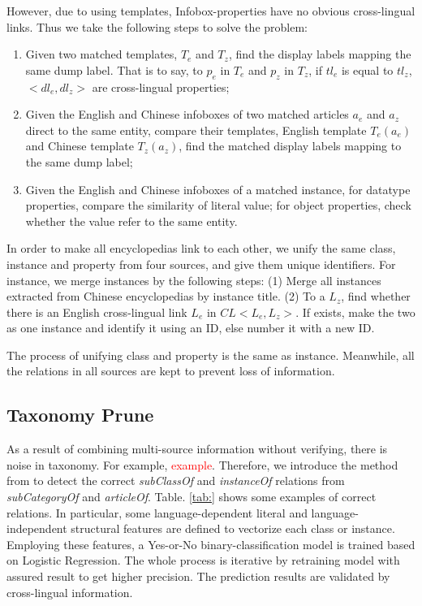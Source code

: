 \documentclass[runningheads,a4paper]{llncs}
\begin{document}
However, due to using templates, Infobox-properties have no obvious cross-lingual links. Thus we take the following steps to solve the problem: 
\begin{enumerate}[1)]
    \item Given two matched templates, $T_{e}$ and $T_{z}$, find the display labels mapping the same dump label. That is to say, to $p_{e}$ in $T_{e}$ and $p_{z}$ in $T_{z}$, if $tl_{e}$ is equal to $tl_{z}$, $<dl_{e},dl_{z}>$ are cross-lingual properties;
    \item Given the English and Chinese infoboxes of two matched articles $a_{e}$ and $a_{z}$ direct to the same entity, compare their templates, English template $T_{e}(a_{e})$ and Chinese template $T_{z}(a_{z})$, find the matched display labels mapping to the same dump label; 
    \item Given the English and Chinese infoboxes of a matched instance, for datatype properties, compare the similarity of literal value; for object properties, check whether the value refer to the same entity.
\end{enumerate}

In order to make all encyclopedias link to each other, we unify the same class, instance and property from four sources, and give them unique identifiers. For instance, we merge instances by the following steps: (1) Merge all instances extracted from Chinese encyclopedias by instance title. (2) To a $L_{z}$, find whether there is an English cross-lingual link $L_{e}$ in $CL<L_{e}, L_{z}>$. If exists, make the two as one instance and identify it using an ID, else number it with a new ID.

The process of unifying class and property is the same as instance. Meanwhile, all the relations in all sources are kept to prevent loss of information.

\subsection{Taxonomy Prune}
\label{sec:tp}

As a result of combining multi-source information without verifying, there is noise in taxonomy. For example, \textcolor{red}{example}. Therefore, we introduce the method from\cite{wang2014cross} to detect the correct \textit{subClassOf} and \textit{instanceOf} relations from \textit{subCategoryOf} and \textit{articleOf}. Table. \ref{tab:} shows some examples of correct relations. In particular, some language-dependent literal and language-independent structural features are defined to vectorize each class or instance. Employing these features, a Yes-or-No binary-classification model is trained based on Logistic Regression. The whole process is iterative by retraining model with assured result to get higher precision. The prediction results are validated by cross-lingual information.
\end{document}
